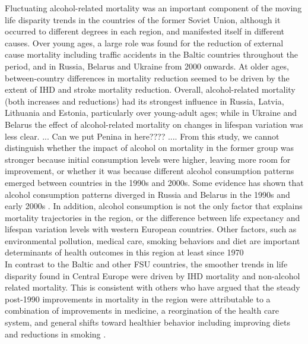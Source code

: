 \documentclass{article}
\begin{document}
\begin{spacing}{1.5}
Fluctuating alcohol-related mortality was an important component of the moving life disparity trends in the \textcolor[rgb]{1,0,0}{countries of the former Soviet Union, although it occurred to different degrees in each region, and manifested itself in different causes. Over young ages, a large role was found for the reduction of external cause mortality including traffic accidents in the Baltic countries throughout the period, and in Russia, Belarus and Ukraine from 2000 onwards.  At older ages, between-country differences in mortality reduction seemed to be driven by the extent of IHD and stroke mortality reduction. Overall, alcohol-related mortality (both increases and reductions) had its strongest influence in Russia, Latvia, Lithuania and Estonia, particularly over young-adult ages; while in Ukraine and Belarus the effect of alcohol-related mortality on changes in lifespan variation was less clear. ... Can we put Penina in here???? .... From this study, we cannot distinguish whether the impact of alcohol on mortality in the former group was stronger because initial consumption levels were higher, leaving more room for improvement, or whether it was because different alcohol consumption patterns emerged between countries in the 1990s and 2000s. Some evidence has shown that alcohol consumption patterns diverged in Russia and Belarus in the 1990s and early 2000s \citep{grigoriev2015}. In addition, alcohol consumption is not the only factor that explains mortality trajectories in the region, or the difference between life expectancy and lifespan variation levels with western European countries. Other factors, such as environmental pollution, medical care, smoking behaviors and diet are important determinants of health outcomes in this region at least since 1970 \citep{bobak1996east}} \\

\textcolor[rgb]{1,0,0}{In contrast to the Baltic and other FSU countries, the smoother trends in life disparity found in Central Europe were driven by IHD mortality and non-alcohol related mortality. This is consistent with others who have argued that the steady post-1990 improvements in mortality in the region were attributable to a combination of improvements in medicine, a reorgination of the health care system, and general shifts toward healthier behavior including improving diets and reductions in smoking \citep{pajkak2011cardiovascular, zatonski1998ecological, Fihel2017, cifkova2010, rychtarikova2004}.}\\ 


\end{spacing}
\end{document}
